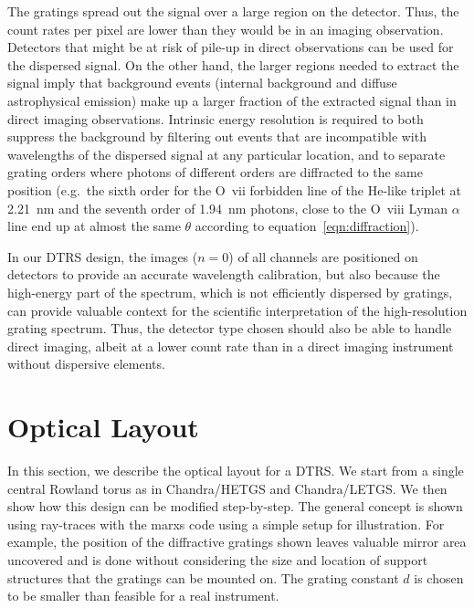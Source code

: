 \documentclass[twocolumn]{aastex631}
\begin{document}
The gratings spread out the signal over a large region on the detector. Thus, the count rates per pixel are lower than they would be in an imaging observation. Detectors that might be at risk of pile-up in direct observations can be used for the dispersed signal. On the other hand, the larger regions needed to extract the signal imply that background events (internal background and diffuse astrophysical emission) make up a larger fraction of the extracted signal than in direct imaging observations.
Intrinsic energy resolution is required to both suppress the background by filtering out events that are incompatible with wavelengths of the dispersed signal at any particular location, and to separate grating orders where photons of different orders are diffracted to the same position (e.g.\ the sixth order for the O~{\sc vii} forbidden line of the He-like triplet at 2.21~nm and the seventh order of 1.94~nm photons, close to the O~{\sc viii} Lyman $\alpha$ line end up at almost the same $\theta$ according to equation~\ref{eqn:diffraction}).

In our DTRS design, the images ($n=0$) of all channels are positioned on detectors to provide an accurate wavelength calibration, but also because the high-energy part of the spectrum, which is not efficiently dispersed by gratings, can provide valuable context for the scientific interpretation of the high-resolution grating spectrum. Thus, the detector type chosen should also be able to handle direct imaging, albeit at a lower count rate than in a direct imaging instrument without dispersive elements.

\section{Optical Layout}
\label{sect:opticallayout}
In this section, we describe the optical layout for a DTRS. We start from a single central Rowland torus as in Chandra/HETGS and Chandra/LETGS. We then show how this design can be modified step-by-step.
The general concept is shown using ray-traces with the marxs code \citep{2017AJ....154..243G} using a simple setup for illustration.
For example, the position of the diffractive gratings shown leaves valuable mirror area uncovered and is done without considering the size and location of support structures that the gratings can be mounted on. The grating constant $d$ is chosen to be smaller than feasible for a real instrument.
\end{document}
